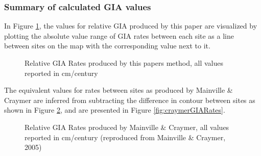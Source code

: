 
\subsubsection{Summary of calculated GIA values}

In Figure \ref{fig:myGIARates}, the values for relative GIA produced by this paper are
visualized by plotting the absolute value range of GIA rates between each site
as a line between sites on the map with the corresponding value next to it.

\begin{figure}[h]
	\caption{Relative GIA Rates produced by this papers method, all values reported in cm/century}
	\label{fig:myGIARates}
\end{figure}
\newpage

The equivalent values for rates between sites as produced by Mainville \& Craymer
are inferred from subtracting the difference in contour between sites as shown in
Figure \ref{fig:craymerGIARatesBigPlot}, and are presented in Figure \ref{fig:craymerGIARates}.

\begin{figure}[h]
	\caption{Relative GIA Rates produced by Mainville \& Craymer, all values reported in cm/century (reproduced from Mainville \& Craymer, 2005)}
	\label{fig:craymerGIARatesBigPlot}
\end{figure}

